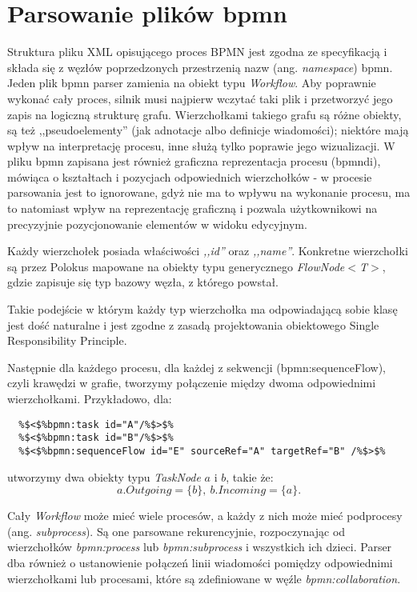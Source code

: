 \documentclass[declaration,shortabstract,mgr]{iithesis}
\newcommand{\bpmn}{BPMN }
\begin{document}
\section{Parsowanie plików bpmn}
Struktura pliku XML opisującego proces \bpmn jest zgodna ze specyfikacją i składa się z węzłów poprzedzonych przestrzenią nazw (ang. \textit{namespace}) bpmn. Jeden plik bpmn parser zamienia na obiekt typu \textit{Workflow}.  Aby poprawnie wykonać cały proces, silnik musi najpierw wczytać taki plik i przetworzyć jego zapis na logiczną strukturę grafu. Wierzchołkami takiego grafu są różne obiekty, są też ,,pseudoelementy'' (jak adnotacje albo definicje wiadomości); niektóre mają wpływ na interpretację procesu, inne służą tylko poprawie jego wizualizacji. W pliku bpmn zapisana jest również graficzna reprezentacja procesu (bpmndi), mówiąca o kształtach i pozycjach odpowiednich wierzchołków - w procesie parsowania jest to ignorowane, gdyż nie ma to wpływu na wykonanie procesu, ma to natomiast wpływ na reprezentację graficzną i pozwala użytkownikowi na precyzyjnie pozycjonowanie elementów w widoku edycyjnym.

Każdy wierzchołek posiada właściwości \textit{,,id''} oraz \textit{,,name''}. Konkretne wierzchołki są przez Polokus mapowane na obiekty typu generycznego \emph{FlowNode$<$T$>$}, gdzie zapisuje się typ bazowy węzła, z którego powstał. 

Takie podejście w którym każdy typ wierzchołka ma odpowiadającą sobie klasę jest dość naturalne i jest zgodne z zasadą projektowania obiektowego Single Responsibility Principle. 

Następnie dla każdego procesu, dla każdej z sekwencji (bpmn:sequenceFlow), czyli krawędzi w grafie, tworzymy połączenie między dwoma odpowiednimi wierzchołkami. Przykładowo, dla:

\begin{minipage}[c]{\textwidth}
\centering
\begin{lstlisting}
  %$<$%bpmn:task id="A"/%$>$%
  %$<$%bpmn:task id="B"/%$>$%
  %$<$%bpmn:sequenceFlow id="E" sourceRef="A" targetRef="B" /%$>$%
\end{lstlisting}
\end{minipage}

\noindent utworzymy dwa obiekty typu \textit{TaskNode} $a$ i $b$, takie że: $$a.Outgoing = \{b\},\ b.Incoming = \{a\}.$$

Cały \textit{Workflow} może mieć wiele procesów, a każdy z nich może mieć podprocesy (ang. \textit{subprocess}). Są one parsowane rekurencyjnie, rozpoczynając od wierzchołków \textit{bpmn:process} lub \textit{bpmn:subprocess} i wszystkich ich dzieci. Parser dba również o ustanowienie połączeń linii wiadomości pomiędzy odpowiednimi wierzchołkami lub procesami, które są zdefiniowane w węźle \textit{bpmn:collaboration}.
\end{document}

